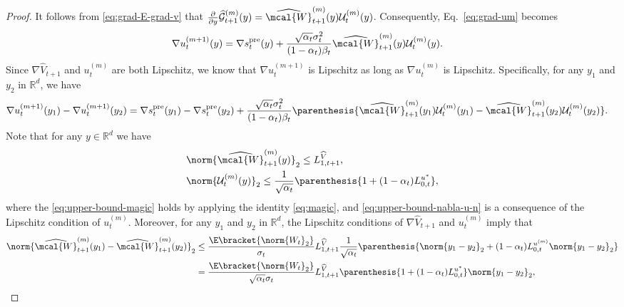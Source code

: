 \documentclass{article}
\newcommand{\R}{\mathbb{R}}
\begin{document}
\begin{proof}
It follows from \eqref{eq:grad-E-grad-v} that $\frac{\partial}{\partial y} \widehat{\mathcal{G}}_{t+1}^{(m)}(y) =\widehat{\mcal{W}}_{t+1}^{{(m)}}(y) 
\mathcal{U}^{(m)}_t(y) $. Consequently, Eq.~\eqref{eq:grad-um} becomes
\begin{align}
    \nabla u_{t}^{(m+1)}(y)  & = \nabla s_{t}^{\rm pre}(y)  + \frac{\sqrt{\alpha_{t}}\sigma_{t}^{2}}{(1 - \alpha_{t})\beta_t} \widehat{\mcal{W}}_{t+1}^{{(m)}}(y) \mathcal{U}^{(m)}_t(y). \label{eq:grad-u-m-w}
\end{align}
Since $\nabla \widehat{V}_{t+1}$ and $u_t^{(m)}$ are both Lipschitz, we 
know that $ \nabla u_{t}^{(m+1)} $ is Lipschitz as long as $ \nabla u_{t}^{(m)} $ is Lipschitz. Specifically, for any $y_1$ and $y_2$ in $\R^d$, we have
\begin{align*}
\nabla u_t^{(m+1)} (y_1) - \nabla u_t^{(m+1)} (y_2)  & = \nabla s_{t}^{\rm pre}(y_{1}) - \nabla s_{t}^{\rm pre}(y_{2})  +  \frac{\sqrt{\alpha_{t}}\sigma_{t}^{2}}{(1 - \alpha_{t})\beta_t} \parenthesis{\widehat{\mcal{W}}_{t+1}^{{(m)}}(y_1) \mathcal{U}^{(m)}_t(y_1) - \widehat{\mcal{W}}_{t+1}^{{(m)}}(y_2) \mathcal{U}^{(m)}_t(y_2)}.
\end{align*}
Note that for any $ y \in \R^d $ we have
\begin{align}
    & \norm{\widehat{\mcal{W}}_{t+1}^{{(m)}}(y)}_{2} \leq L_{1, t+1}^{\widehat{V}}, \label{eq:upper-bound-magic} \\ 
    & \norm{ \mathcal{U}^{(m)}_t(y)}_2 \leq \frac{1}{\sqrt{\alpha_{t}}}\parenthesis{1 + (1 - \alpha_{t})L_{0,t}^{u^{*}}}, \label{eq:upper-bound-nabla-u-n}
\end{align}
where the \eqref{eq:upper-bound-magic} holds by applying the identity \eqref{eq:magic}, and \eqref{eq:upper-bound-nabla-u-n} is a consequence of the Lipschitz condition of $ u_{t}^{(m)} $.
Moreover, for any $ y_{1} $ and $ y_{2} $ in $\R^d$, the Lipschitz conditions of $ \nabla \widehat{V}_{t+1} $ and $ u_{t}^{(m)} $ imply that
\begin{align}
    \norm{\widehat{\mcal{W}}_{t+1}^{{(m)}}(y_1) - \widehat{\mcal{W}}_{t+1}^{{(m)}}(y_2)}_2 \nonumber & \leq \frac{\E\bracket{\norm{W_{t}}_2}}{\sigma_{t}}L_{1, t+1}^{\widehat{V}}\frac{1}{\sqrt{\alpha_{t}}}\parenthesis{\norm{y_{1} - y_{2}}_2 + (1 - \alpha_{t})L_{0, t}^{u^{(m)}}\norm{y_{1} - y_{2}}_2} \nonumber \\ & = \frac{\E\bracket{\norm{W_{t}}_2}}{\sqrt{\alpha_{t}}\sigma_{t}}L_{1, t+1}^{\widehat{V}}\parenthesis{1 + (1 - \alpha_{t})L_{0, t}^{u^{*}}}\norm{y_{1} - y_{2}}_2, \label{eq:Lip-nabla-V-w}
\end{align}

\end{proof}
\end{document}
